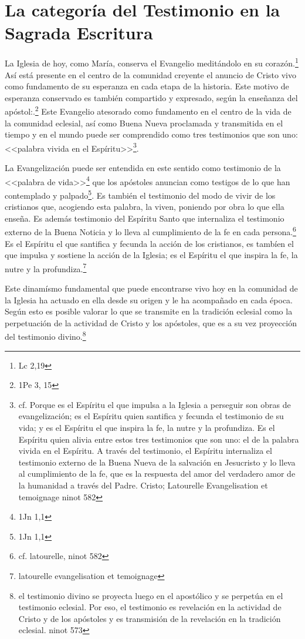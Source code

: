 \section{La categoría del Testimonio en la Sagrada Escritura}
La Iglesia de hoy, como María, conserva el Evangelio meditándolo en su
corazón.\footnote{Lc 2,19} Así está presente en el centro de la comunidad
creyente el anuncio de Cristo vivo como fundamento de su esperanza en cada etapa
de la historia. Este motivo de esperanza conservado es también compartido y
expresado, según la enseñanza del apóstol:.\footnote{1Pe 3, 15} Este Evangelio
atesorado como fundamento en el centro de la vida de la comunidad eclesial, así
como Buena Nueva proclamada y transmitida en el tiempo y en el mundo puede ser
comprendido como tres testimonios que son uno:<<palabra vivida en el
Espíritu>>\footnote{cf. Porque es el Espíritu el que impulsa a la Iglesia a
  perseguir son obras de evangelización; es el Espíritu quien santifica y
  fecunda el testimonio de su vida; y es el Espíritu el que inspira la fe, la
  nutre y la profundiza. Es el Espíritu quien alivia entre estos tres
  testimonios que son uno: el de la palabra vivida en el Espíritu. A través del
  testimonio, el Espíritu internaliza el testimonio externo de la Buena Nueva de
  la salvación en Jesucristo y lo lleva al cumplimiento de la fe, que es la
  respuesta del amor del verdadero amor de la humanidad a través del Padre.
  Cristo; Latourelle Evangelisation et temoignage ninot 582}.

La Evangelización puede ser entendida en este sentido como testimonio de la
<<palabra de vida>>\footnote{1Jn 1,1} que los apóstoles anuncian como testigos
de lo que han contemplado y palpado\footnote{1Jn 1,1}. Es también el testimonio
del modo de vivir de los cristianos que, acogiendo esta palabra, la viven,
poniendo por obra lo que ella enseña. Es además testimonio del Espíritu Santo
que internaliza el testimonio externo de la Buena Noticia y lo lleva al
cumplimiento de la fe en cada persona.\footnote{cf. latourelle, ninot 582} Es el
Espíritu el que santifica y fecunda la acción de los cristianos, es tambíen el
que impulsa y sostiene la acción de la Iglesia; es el Espíritu el que inspira la
fe, la nutre y la profundiza.\footnote{latourelle evangelisation et temoignage}

Este dinamísmo fundamental que puede encontrarse vivo hoy en la comunidad de la
Iglesia ha actuado en ella desde su origen y le ha acompañado en cada época.
Según esto es posible valorar lo que se transmite en la tradición eclesial como
la perpetuación de la actividad de Cristo y los apóstoles, que es a su vez
proyección del testimonio divino.\footnote{ el testimonio divino se proyecta
  luego en el apostólico y se perpetúa en el testimonio eclesial. Por eso, el
  testimonio es revelación en la actividad de Cristo y de los apóstoles y es
  transmisión de la revelación en la tradición eclesial. ninot 573}

